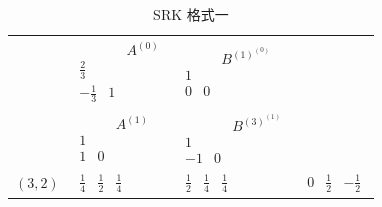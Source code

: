 \begin{table}[!htbp]
	\centering
	\begin{tabular}{p{1cm}<{\centering} | p{2.5cm}<{\centering} | p{2.5cm}<{\centering} |p{2cm}<{\centering}}
		\multirow{2}{*}{}
		\rule{0pt}{30pt} &  
		$\begin{matrix}	&&A^{(0)}\\\frac23 &&\\-\frac13&1& \end{matrix}$& 
		$\begin{matrix} &&B^{(1)^{(0)}} \\ 1&&\\0&0&  \end{matrix}$ & \\
		\cline{2-4}
		\rule{0pt}{30pt} & 
		$\begin{matrix} &&A^{(1)} \\ 1&&\\1&0& \end{matrix}$ & 
		$\begin{matrix} &&B^{(3)^{(1)}} \\ 1&&\\-1&0&\end{matrix} $ & \\
		\hline
		\rule{0pt}{15pt} $(3,2)$ &  
		$\begin{matrix} \frac14&\frac12&\frac14 &  \end{matrix}$ & 
		$\begin{matrix} \frac12&\frac14&\frac14 ~& \end{matrix}$ & 
		$\begin{matrix} 0&\frac12&-\frac12   \end{matrix}$\\
	\end{tabular}
\vspace{.2cm}
\caption{SRK 格式一} \label{SRK1}
\end{table}
